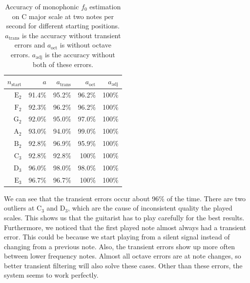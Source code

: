 \documentclass[10pt,twocolumn]{article}
\begin{document}
\begin{table}[H]\vspace{-3mm}
    \centering
    \begin{tabular}{r|rrrr}
        $n_\text{start}$ & $a$ & $a_\text{trans}$ & $a_\text{oct}$ & $a_\text{adj}$ \\
        \hline
        $\text{E}_2$ & 91.4\% & 95.2\% & 96.2\% & 100\% \\
        $\text{F}_2$ & 92.3\% & 96.2\% & 96.2\% & 100\% \\
        $\text{G}_2$ & 92.0\% & 95.0\% & 97.0\% & 100\% \\
        $\text{A}_2$ & 93.0\% & 94.0\% & 99.0\% & 100\% \\
        $\text{B}_2$ & 92.8\% & 96.9\% & 95.9\% & 100\% \\
        $\text{C}_3$ & 92.8\% & 92.8\% & 100\%  & 100\% \\
        $\text{D}_3$ & 96.0\% & 98.0\% & 98.0\% & 100\% \\
        $\text{E}_3$ & 96.7\% & 96.7\% & 100\%  & 100\%
    \end{tabular}
    \caption{Accuracy of monophonic $f_0$ estimation on C major scale at two notes per second for different starting positions. $a_\text{trans}$ is the accuracy without transient errors and $a_\text{oct}$ is without octave errors. $a_\text{adj}$ is the accuracy without both of these errors.}
    \label{tab:monperf}
\end{table}\vspace{-3mm}
We can see that the transient errors occur about 96\% of the time. There are two outliers at $\text{C}_3$ and $\text{D}_3$, which are the cause of inconsistent quality the played scales. This shows us that the guitarist has to play carefully for the best results. Furthermore, we noticed that the first played note almost always had a transient error. This could be because we start playing from a silent signal instead of changing from a previous note. Also, the transient errors show up more often between lower frequency notes. Almost all octave errors are at note changes, so better transient filtering will also solve these cases. Other than these errors, the system seems to work perfectly.
\end{document}
